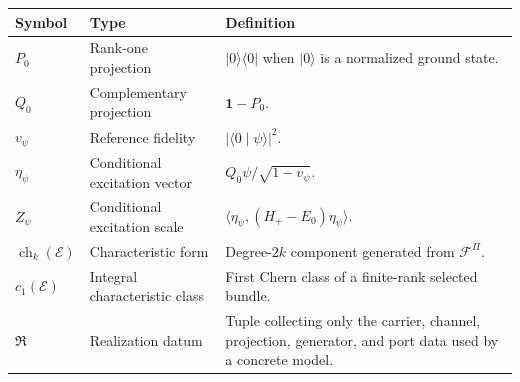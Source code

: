 \documentclass[11pt,reqno]{scrartcl}
\newcommand{\ket}[1]{\lvert #1\rangle}
\newcommand{\bra}[1]{\langle #1\rvert}
\newcommand{\braket}[2]{\langle #1\mid #2\rangle}
\newcommand{\inner}[2]{\langle #1,#2\rangle}
\theoremstyle{plain}
\theoremstyle{definition}
\theoremstyle{remark}
\begin{document}
\begin{center}
\small
\begin{tabularx}{\textwidth}{>{\raggedright\arraybackslash}p{} >{\raggedright\arraybackslash}p{} X}
\toprule
\textbf{Symbol} & \textbf{Type} & \textbf{Definition} \\
\midrule
\(P_0\) & Rank-one projection & \(\ket0\bra0\) when \(\ket0\) is a normalized ground state. \\
\(Q_0\) & Complementary projection & \(\mathbf1-P_0\). \\
\(v_\psi\) & Reference fidelity & \(|\braket0\psi|^2\). \\
\(\eta_\psi\) & Conditional excitation vector & \(Q_0\psi/\sqrt{1-v_\psi}\). \\
\(Z_\psi\) & Conditional excitation scale & \(\inner{\eta_\psi}{(H_+-E_0)\eta_\psi}\). \\
\(\operatorname{ch}_k(\mathscr E)\) & Characteristic form & Degree-\(2k\) component generated from \(\mathcal F^\Pi\). \\
\(c_1(\mathscr E)\) & Integral characteristic class & First Chern class of a finite-rank selected bundle. \\
\(\mathfrak R\) & Realization datum & Tuple collecting only the carrier, channel, projection, generator, and port data used by a concrete model. \\
\bottomrule
\end{tabularx}
\end{center}
\end{document}
